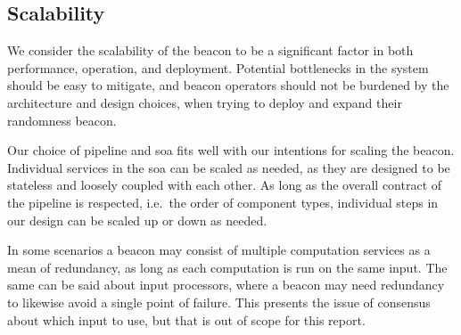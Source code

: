 \subsection{Scalability}
We consider the scalability of the beacon to be a significant factor in both performance, operation, and deployment.
Potential bottlenecks in the system should be easy to mitigate, and beacon operators should not be burdened by the architecture and design choices, when trying to deploy and expand their randomness beacon.

Our choice of pipeline and \gls{soa} fits well with our intentions for scaling the beacon.
Individual services in the \gls{soa} can be scaled as needed, as they are designed to be stateless and loosely coupled with each other.
As long as the overall contract of the pipeline is respected, i.e.\ the order of component types, individual steps in our design can be scaled up or down as needed.

In some scenarios a beacon may consist of multiple computation services as a mean of redundancy, as long as each computation is run on the same input.
The same can be said about input processors, where a beacon may need redundancy to likewise avoid a single point of failure.
This presents the issue of consensus about which input to use, but that is out of scope for this report.

